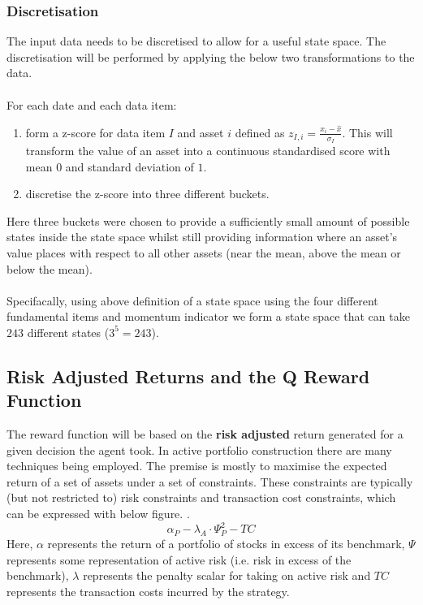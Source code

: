 \documentclass[dvips,12pt]{article}
\begin{document}
\subsubsection*{Discretisation}
The input data needs to be discretised to allow for a useful state space. The discretisation will be performed by applying the below two transformations to the data.
\\\\
For each date and each data item:
\begin{enumerate}
\item form a z-score for data item $I$ and asset $i$ defined as $z_{I,i} = \frac{x_i - \hat{x}}{\sigma_I}$. This will transform the value of an asset into a continuous standardised score with mean $0$ and standard deviation of $1$.
\item discretise the z-score into three different buckets. 
\end{enumerate}

Here three buckets were chosen to provide a sufficiently small amount of possible states inside the state space whilst still providing information where an asset's value places with respect to all other assets (near the mean, above the mean or below the mean).
\\\\ 
Specifacally, using above definition of a state space using the four different fundamental items and momentum indicator we form a state space that can take $243$ different states ($3^5 = 243$).

\subsection*{Risk Adjusted Returns and the Q Reward Function}
The reward function will be based on the \textbf{risk adjusted} return generated for a given decision the agent took.
In active portfolio construction there are many techniques being employed. The premise is mostly to maximise the expected return of a set of assets under a set of constraints. These constraints are typically (but not restricted to) risk constraints and transaction cost constraints, which can be expressed with below figure. \cite{grinoldkahn1999}.
\begin{equation}
	\alpha_P - \lambda_A \cdot \Psi_P^2 - TC
	\label{eq:max}
\end{equation}
Here, $\alpha$ represents the return of a portfolio of stocks in excess of its benchmark, $\Psi$ represents some representation of active risk (i.e. risk in excess of the benchmark), $\lambda$ represents the penalty scalar for taking on active risk and $TC$ represents the transaction costs incurred by the strategy.
\end{document}
